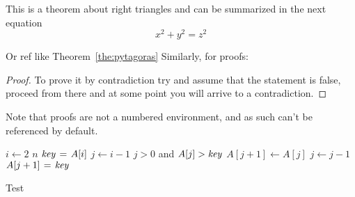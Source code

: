 \begin{theorem}
    \label{pythagorean}
    This is a theorem about right triangles and can be summarized in the next
    equation
    \[ x^2 + y^2 = z^2 \]
    \label{the:pytagoras}
\end{theorem}


Or ref like Theorem~\ref{the:pytagoras} Similarly, for proofs:


\begin{proof}
    To prove it by contradiction try and assume that the statement is false, proceed from there and at some point you will arrive to a contradiction.
\end{proof}


Note that proofs are not a numbered environment, and as such can't be referenced by default.

\begin{algorithm}[htb!]
    \begin{codebox}
        \li \For $i \gets 2$ \To $n$
        \li \Do
        $\id{key} \gets A[i]$
        \li {}
        \li $j \gets i-1$
        \li \While $j > 0$ and $A[j] > \id{key}$
        \li \Do
        $A[j+1] \gets A[j]$
        \li $j \gets j-1$
        \End
        \li $A[j+1] \gets \id{key}$
        \End
    \end{codebox}
    \caption{Test}
    \label{alg:algorithm}
\end{algorithm}
